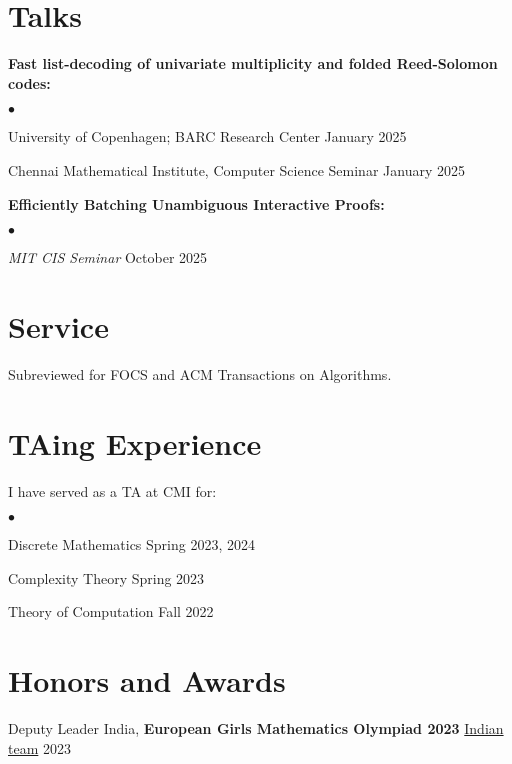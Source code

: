 \documentclass[margin,line, 10pt]{res}
\newenvironment{list2}{
  \begin{list}{$\bullet$}{%
      \setlength{\itemsep}{0in}
      \setlength{\parsep}{0in} \setlength{\parskip}{0in}
      \setlength{\topsep}{0in} \setlength{\partopsep}{0in} 
      \setlength{\leftmargin}{0.2in}}}{\end{list}}
\begin{document}
\begin{resume}
\section{Talks}
{\bf Fast list-decoding of univariate multiplicity and folded Reed-Solomon codes:}
\begin{list2}
    \item University of Copenhagen; BARC Research Center \hfill January 2025
    \item Chennai Mathematical Institute, Computer Science Seminar \hfill January 2025
\end{list2}

{\bf Efficiently Batching Unambiguous Interactive Proofs:}
\begin{list2}
    \item \textit{MIT CIS Seminar} {\hfill October 2025}
\end{list2}

\section{Service}
Subreviewed for FOCS and ACM Transactions on Algorithms.



\section{TAing Experience}
I have served as a TA at CMI for:
\begin{list2}
    \item Discrete Mathematics \hfill Spring 2023, 2024
    \item Complexity Theory \hfill Spring 2023
    \item Theory of Computation \hfill Fall 2022
\end{list2}

\section{\sc Honors and Awards} 

Deputy Leader India, {\bf European Girls Mathematics Olympiad 2023} \href{https://www.egmo.org/egmos/egmo12/countries/country35/}{Indian team} \hfill 2023

\vspace*{-2.5mm}


\end{resume}
\end{document}
